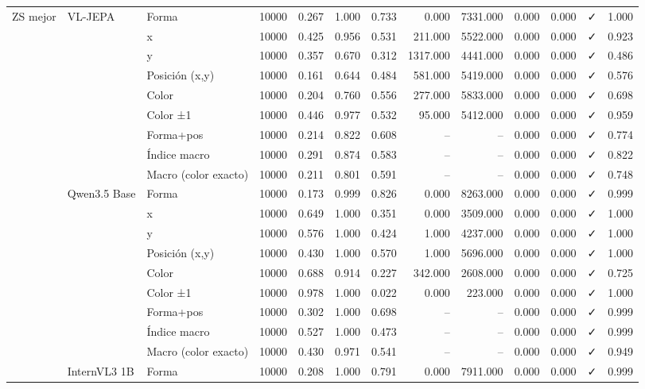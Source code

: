 \begin{tabular}{lllrrrrrrrrlr}
\cline{1-13} \cline{2-13}
\multirow[t]{36}{*}{ZS mejor} & \multirow[t]{9}{*}{VL-JEPA} & Forma & 10000 & 0.267 & 1.000 & 0.733 & 0.000 & 7331.000 & 0.000 & 0.000 & ✓ & 1.000 \\
 &  & x & 10000 & 0.425 & 0.956 & 0.531 & 211.000 & 5522.000 & 0.000 & 0.000 & ✓ & 0.923 \\
 &  & y & 10000 & 0.357 & 0.670 & 0.312 & 1317.000 & 4441.000 & 0.000 & 0.000 & ✓ & 0.486 \\
 &  & Posición (x,y) & 10000 & 0.161 & 0.644 & 0.484 & 581.000 & 5419.000 & 0.000 & 0.000 & ✓ & 0.576 \\
 &  & Color & 10000 & 0.204 & 0.760 & 0.556 & 277.000 & 5833.000 & 0.000 & 0.000 & ✓ & 0.698 \\
 &  & Color ±1 & 10000 & 0.446 & 0.977 & 0.532 & 95.000 & 5412.000 & 0.000 & 0.000 & ✓ & 0.959 \\
 &  & Forma+pos & 10000 & 0.214 & 0.822 & 0.608 & -- & -- & 0.000 & 0.000 & ✓ & 0.774 \\
 &  & Índice macro & 10000 & 0.291 & 0.874 & 0.583 & -- & -- & 0.000 & 0.000 & ✓ & 0.822 \\
 &  & Macro (color exacto) & 10000 & 0.211 & 0.801 & 0.591 & -- & -- & 0.000 & 0.000 & ✓ & 0.748 \\
\cline{2-13}
 & \multirow[t]{9}{*}{Qwen3.5 Base} & Forma & 10000 & 0.173 & 0.999 & 0.826 & 0.000 & 8263.000 & 0.000 & 0.000 & ✓ & 0.999 \\
 &  & x & 10000 & 0.649 & 1.000 & 0.351 & 0.000 & 3509.000 & 0.000 & 0.000 & ✓ & 1.000 \\
 &  & y & 10000 & 0.576 & 1.000 & 0.424 & 1.000 & 4237.000 & 0.000 & 0.000 & ✓ & 1.000 \\
 &  & Posición (x,y) & 10000 & 0.430 & 1.000 & 0.570 & 1.000 & 5696.000 & 0.000 & 0.000 & ✓ & 1.000 \\
 &  & Color & 10000 & 0.688 & 0.914 & 0.227 & 342.000 & 2608.000 & 0.000 & 0.000 & ✓ & 0.725 \\
 &  & Color ±1 & 10000 & 0.978 & 1.000 & 0.022 & 0.000 & 223.000 & 0.000 & 0.000 & ✓ & 1.000 \\
 &  & Forma+pos & 10000 & 0.302 & 1.000 & 0.698 & -- & -- & 0.000 & 0.000 & ✓ & 0.999 \\
 &  & Índice macro & 10000 & 0.527 & 1.000 & 0.473 & -- & -- & 0.000 & 0.000 & ✓ & 0.999 \\
 &  & Macro (color exacto) & 10000 & 0.430 & 0.971 & 0.541 & -- & -- & 0.000 & 0.000 & ✓ & 0.949 \\
\cline{2-13}
 & \multirow[t]{9}{*}{InternVL3 1B} & Forma & 10000 & 0.208 & 1.000 & 0.791 & 0.000 & 7911.000 & 0.000 & 0.000 & ✓ & 0.999 \\

\end{tabular}
